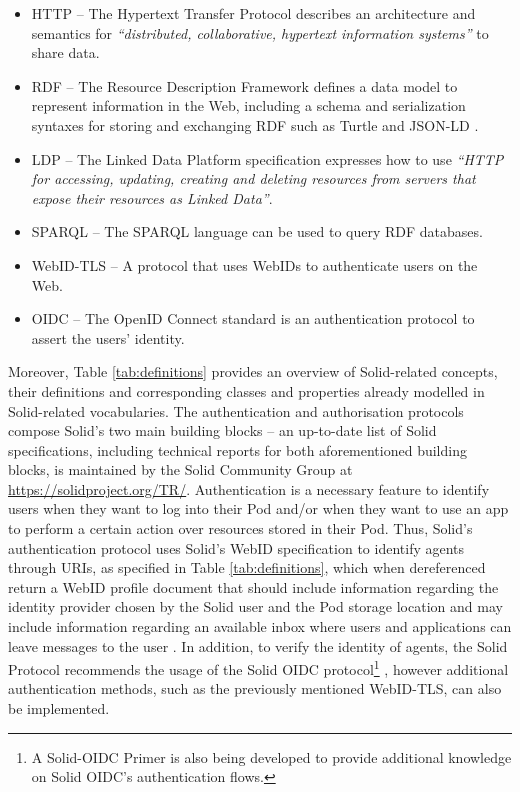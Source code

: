 \begin{itemize}
    \item HTTP \citep{fielding_http_2022} -- The Hypertext Transfer Protocol describes an architecture and semantics for \textit{``distributed, collaborative, hypertext information systems''} to share data.
    \item RDF \citep{cyganiak_rdf_2014} -- The Resource Description Framework defines a data model to represent information in the Web, including a schema \citep{brickley_rdf_2014} and serialization syntaxes for storing and exchanging RDF such as Turtle \citep{prudhommeaux_rdf_2014} and JSON-LD \citep{gregg_kellogg_json-ld_2020}.
    \item LDP \citep{speicher_linked_2015} -- The Linked Data Platform specification expresses how to use \textit{``HTTP for accessing, updating, creating and deleting resources from servers that expose their resources as Linked Data''}.
    \item SPARQL \citep{harris_sparql_2013} -- The SPARQL language can be used to query RDF databases. %
    \item WebID-TLS \citep{story_webid-tls_2014} -- A protocol that uses WebIDs to authenticate users on the Web.
    \item OIDC \citep{sakimura_openid_2014} -- The OpenID Connect standard is an authentication protocol to assert the users' identity. 
\end{itemize}

Moreover, Table \ref{tab:definitions} provides an overview of Solid-related concepts, their definitions and corresponding classes and properties already modelled in Solid-related vocabularies.
The authentication and authorisation protocols compose Solid's two main building blocks -- an up-to-date list of Solid specifications, including technical reports for both aforementioned building blocks, is maintained by the Solid Community Group at \url{https://solidproject.org/TR/}.
Authentication is a necessary feature to identify users when they want to log into their Pod and/or when they want to use an app to perform a certain action over resources stored in their Pod.
Thus, Solid's authentication protocol uses Solid's WebID specification to identify agents through URIs, as specified in Table \ref{tab:definitions}, which when dereferenced return a WebID profile document that should include information regarding the identity provider chosen by the Solid user and the Pod storage location and may include information regarding an available inbox where users and applications can leave messages to the user \citep{balseiro_solid_2022}.
In addition, to verify the identity of agents, the Solid Protocol recommends the usage of the Solid OIDC protocol\footnote{A Solid-OIDC Primer \citep{morgan_oidcprimer_2022} is also being developed to provide additional knowledge on Solid OIDC's authentication flows.} \citep{coburn_oidc_2022}, however additional authentication methods, such as the previously mentioned WebID-TLS, can also be implemented.


